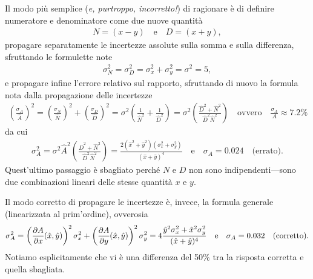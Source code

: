 Il modo pi\`u semplice (\emph{e, purtroppo, incorretto!}) di ragionare \`e di
definire numeratore e denominatore come due nuove quantit\`a
\begin{align*}
  N = (x - y) \quad \text{e} \quad D = (x + y),
\end{align*}
propagare separatamente le incertezze assolute sulla somma e sulla differenza,
sfruttando le formulette note
\begin{align*}
  \sigma^2_N = \sigma^2_D = \sigma^2_x + \sigma^2_y = \sigma^2 = 5,
\end{align*}
e propagare infine l'errore relativo sul rapporto, sfruttando di nuovo la formula
nota dalla propagazione delle incertezze
\begin{align*}
  \left(\frac{\sigma_A}{\hat{A}}\right)^2 =
  \left(\frac{\sigma_N}{\hat{N}}\right)^2 + \left(\frac{\sigma_D}{\hat{D}}\right)^2 =
  \sigma^2 \left( \frac{1}{\hat{N}^2} + \frac{1}{\hat{D}^2} \right) =
  \sigma^2 \left( \frac{\hat{D}^2 + \hat{N}^2}{\hat{D}^2\hat{N}^2} \right)
  \quad \text{ovvero} \quad \frac{\sigma_A}{A} \approx 7.2\%
\end{align*}
da cui
\begin{align*}
  \sigma^2_A = \sigma^2 \hat{A}^2 \left( \frac{\hat{D}^2 + \hat{N}^2}{\hat{D}^2\hat{N}^2} \right) =
  \frac{2\left(\hat{x}^2 + \hat{y}^2\right) \left(\sigma^2_x + \sigma^2_y\right)}{(\hat{x} + \hat{y})^4}
  \quad \text{e} \quad \sigma_A = 0.024 \quad \text{(errato)}.
\end{align*}
Quest'ultimo passaggio \`e sbagliato perché $N$ e $D$ non sono indipendenti---sono
due combinazioni lineari delle stesse quantit\`a $x$ e $y$.

Il modo corretto di propagare le incertezze \`e, invece, la formula generale
(linearizzata al prim'ordine), ovverosia
\begin{align*}
  \sigma^2_A = \left( \pd{A}{x}{\hat{x}, \hat{y}} \right)^2 \sigma^2_x +
  \left( \pd{A}{y}{\hat{x}, \hat{y}} \right)^2 \sigma^2_y =
  4 \frac{\hat{y}^2\sigma^2_x + \hat{x}^2\sigma^2_y}{(\hat{x} + \hat{y})^4}
  \quad \text{e} \quad \sigma_A = 0.032 \quad \text{(corretto)}.
\end{align*}
Notiamo esplicitamente che vi \`e una differenza del 50\% tra la risposta corretta
e quella sbagliata.
